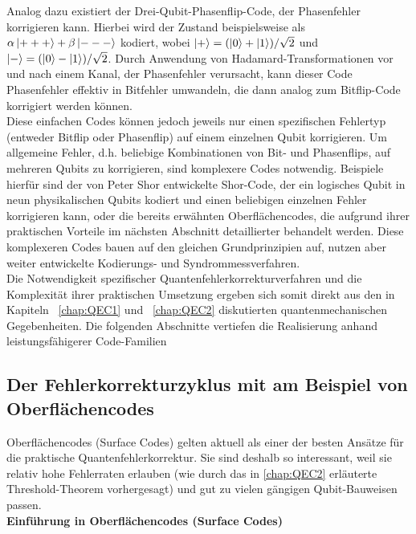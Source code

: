Analog dazu existiert der Drei-Qubit-Phasenflip-Code, der Phasenfehler korrigieren kann. Hierbei wird der Zustand beispielsweise als $\alpha\ket{+++}+\beta\ket{---}$ kodiert, wobei $\ket{+}=(\ket{0}+\ket{1})/\sqrt{2}$ und $\ket{-}=(\ket{0}-\ket{1})/\sqrt{2}$. Durch Anwendung von Hadamard-Transformationen vor und nach einem Kanal, der Phasenfehler verursacht, kann dieser Code Phasenfehler effektiv in Bitfehler umwandeln, die dann analog zum Bitflip-Code korrigiert werden können.\cite[Seite 430-431]{nielsen_quantum_2010}\\

Diese einfachen Codes können jedoch jeweils nur einen spezifischen Fehlertyp (entweder Bitflip oder Phasenflip) auf einem einzelnen Qubit korrigieren. Um allgemeine Fehler, d.h. beliebige Kombinationen von Bit- und Phasenflips, auf mehreren Qubits zu korrigieren, sind komplexere Codes notwendig. Beispiele hierfür sind der von Peter Shor entwickelte Shor-Code, der ein logisches Qubit in neun physikalischen Qubits kodiert und einen beliebigen einzelnen Fehler korrigieren kann, oder die bereits erwähnten Oberflächencodes, die aufgrund ihrer praktischen Vorteile im nächsten Abschnitt detaillierter behandelt werden. Diese komplexeren Codes bauen auf den gleichen Grundprinzipien auf, nutzen aber weiter entwickelte Kodierungs- und Syndrommessverfahren.\cite[Seite 432ff]{nielsen_quantum_2010}\\
Die Notwendigkeit spezifischer Quantenfehlerkorrekturverfahren und die Komplexität ihrer praktischen Umsetzung ergeben sich somit direkt aus den in Kapiteln ~\ref{chap:QEC1} und ~\ref{chap:QEC2} diskutierten quantenmechanischen Gegebenheiten. Die folgenden Abschnitte vertiefen die Realisierung anhand leistungsfähigerer Code-Familien


\subsection{Der Fehlerkorrekturzyklus mit am Beispiel von Oberflächencodes}

Oberflächencodes (Surface Codes) gelten aktuell als einer der besten Ansätze für die praktische Quantenfehlerkorrektur. Sie sind deshalb so interessant, weil sie relativ hohe Fehlerraten erlauben (wie durch das in \ref{chap:QEC2} erläuterte Threshold-Theorem vorhergesagt) und gut zu vielen gängigen Qubit-Bauweisen passen.\\

\textbf{Einführung in Oberflächencodes (Surface Codes)}



